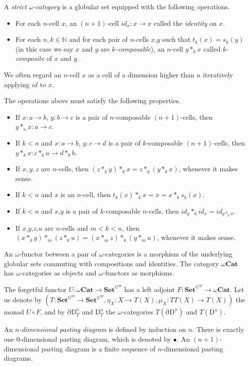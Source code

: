 \documentclass{amsart}
\theoremstyle{definition}
\theoremstyle{remark}
\newcommand{\cat}[1]{\mathbf{#1}}
\newcommand{\bbG}{\mathbb{G}}
\newcommand{\Set}{\cat{Set}}
\newcommand{\PSh}[1]{\Set^{#1^{op}}}
\newcommand{\nats}{\mathbb{N}}
\newcommand{\glob}{\PSh{\bbG}}
\newcommand{\ocat}{\omega \cat{Cat}}
\newcommand{\Dn}[1][n]{\mathrm{D}^{#1}}
\newcommand{\dDn}[1][n]{\mathrm{\partial D}^{#1}}
\numberwithin{table}{section}
\begin{document}
\begin{defn}
A \emph{strict $\omega$-category} is a globular set equipped with the following operations.
\begin{itemize}
\item For each $n$-cell $x$, an $(n+1)$-cell $id_x : x \to x$ called the \emph{identity} on $x$.
\item For each $n,k \in \nats$ and for each pair of $n$-cells $x$,$y$ such that
$t_k(x) = s_k(y)$ (in this case we say $x$ and $y$ are \emph{$k$-composable}),
an $n$-cell $y *_k x$ called \emph{k-composite} of $x$ and $y$.
\end{itemize}
We often regard an $n$-cell $x$ as a cell of a dimension higher than $n$ iteratively applying $id$ to $x$.

The operations above must satisfy the following properties.
\begin{itemize}
\item If $x : a \to b$, $y : b \to c$ is a pair of $n$-composable $(n+1)$-cells, then $y *_n x : a \to c$.
\item If $k < n$ and $x : a \to b$, $y : c \to d$ is a pair of $k$-composable $(n+1)$-cells, then $y *_k x : c *_k a \to d *_k b$.
\item If $x,y,z$ are $n$-cells, then $(z *_k y) *_k x = z *_k (y *_k x)$, whenever it makes sense.
\item If $k < n$ and $x$ is an $n$-cell, then $t_k(x) *_k x = x = x *_k s_k(x)$.
\item If $k < n$ and $x$,$y$ is a pair of $k$-composable $n$-cells, then $id_y *_k id_x = id_{y *_k x}$.
\item If $x$,$y$,$z$,$u$ are $n$-cells and $m < k < n$, then $(x *_k y) *_m (z *_k u) = (x *_m z) *_k (y *_m u)$, whenever it makes sense.
\end{itemize}

An $\omega$-functor between a pair of $\omega$-categories is a morphism of
the underlying globular sets commuting with compositions and identities.
The category $\ocat$ has $\omega$-categories as objects and $\omega$-functors as morphisms.
\end{defn}

The forgetful functor $U : \ocat \to \glob$ has a left adjoint $F : \glob \to \ocat$.
Let us denote by $(T : \glob \to \glob, \eta_X : X \to T(X), \mu_X : T T(X) \to T(X))$ the monad $U \circ F$,
and by $\dDn_T$ and $\Dn_T$ the $\omega$-categories $T(\dDn)$ and $T(\Dn)$.

An \emph{$n$-dimensional pasting diagram} is defined by induction on $n$.
There is exactly one $0$-dimensional pasting diagram, which is denoted by $\bullet$.
An $(n+1)$-dimensional pasting diagram is a finite sequence of $n$-dimensional pasting diagrams.
\end{document}
